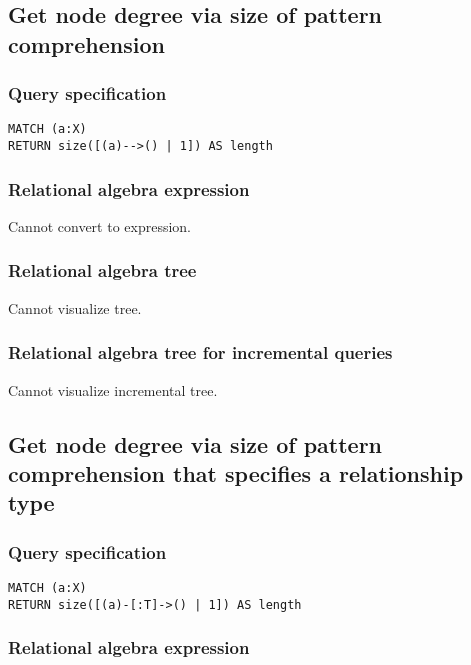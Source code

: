 \subsection{Get node degree via size of pattern comprehension}

\subsubsection*{Query specification}

\begin{lstlisting}
MATCH (a:X)
RETURN size([(a)-->() | 1]) AS length
\end{lstlisting}

\subsubsection*{Relational algebra expression}

Cannot convert to expression.

\subsubsection*{Relational algebra tree}

Cannot visualize tree.

\subsubsection*{Relational algebra tree for incremental queries}

Cannot visualize incremental tree.

\subsection{Get node degree via size of pattern comprehension that specifies a relationship type}

\subsubsection*{Query specification}

\begin{lstlisting}
MATCH (a:X)
RETURN size([(a)-[:T]->() | 1]) AS length
\end{lstlisting}

\subsubsection*{Relational algebra expression}

